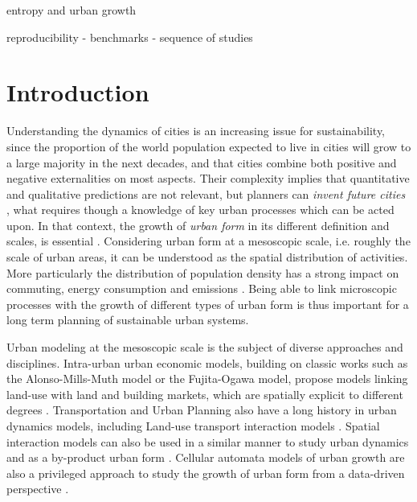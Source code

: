\documentclass[10pt,letterpaper]{article}
\begin{document}
\cite{jun2020modling} entropy and urban growth


\cite{Nicholse2100769118} reproducibility - benchmarks - sequence of studies


\section*{Introduction}


Understanding the dynamics of cities is an increasing issue for sustainability, since the proportion of the world population expected to live in cities will grow to a large majority in the next decades, and that cities combine both positive and negative externalities on most aspects. Their complexity implies that quantitative and qualitative predictions are not relevant, but planners can \emph{invent future cities} \cite{batty2018inventing}, what requires though a knowledge of key urban processes which can be acted upon. In that context, the growth of \emph{urban form} in its different definition and scales, is essential \cite{williams2000achieving}. Considering urban form at a mesoscopic scale, i.e. roughly the scale of urban areas, it can be understood as the spatial distribution of activities. More particularly the distribution of population density has a strong impact on commuting, energy consumption and emissions \cite{le2012urban}. Being able to link microscopic processes with the growth of different types of urban form is thus important for a long term planning of sustainable urban systems.


Urban modeling at the mesoscopic scale is the subject of diverse approaches and disciplines. Intra-urban urban economic models, building on classic works such as the Alonso-Mills-Muth model or the Fujita-Ogawa model, propose models linking land-use with land and building markets, which are spatially explicit to different degrees \cite{viguie2012trade}. Transportation and Urban Planning also have a long history in urban dynamics models, including Land-use transport interaction models \cite{wegener2004land}. Spatial interaction models can also be used in a similar manner to study urban dynamics and as a by-product urban form \cite{milton2019accelerating}. Cellular automata models of urban growth are also a privileged approach to study the growth of urban form from a data-driven perspective \cite{batty1997cellular}.
\end{document}
